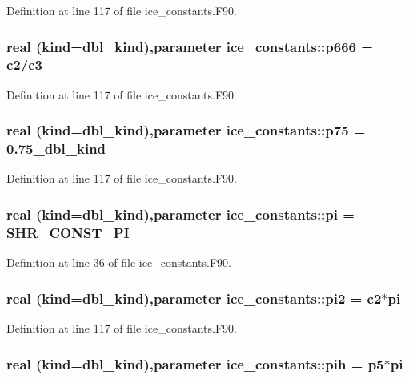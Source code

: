 Definition at line 117 of file ice\_\-constants.F90.\hypertarget{namespaceice__constants_a623680825d166c04e044e75e3eb2d6be}{
\subsubsection[{p666}]{\setlength{\rightskip}{0pt plus 5cm}real (kind=dbl\_\-kind),parameter {\bf ice\_\-constants::p666} = {\bf c2}/{\bf c3}}}
\label{namespaceice__constants_a623680825d166c04e044e75e3eb2d6be}


Definition at line 117 of file ice\_\-constants.F90.\hypertarget{namespaceice__constants_a266f93c94a2bacfaea88290d50220b36}{
\subsubsection[{p75}]{\setlength{\rightskip}{0pt plus 5cm}real (kind=dbl\_\-kind),parameter {\bf ice\_\-constants::p75} = 0.75\_\-dbl\_\-kind}}
\label{namespaceice__constants_a266f93c94a2bacfaea88290d50220b36}


Definition at line 117 of file ice\_\-constants.F90.\hypertarget{namespaceice__constants_ab88fe0d16ebc9529ef11d6fe4343c387}{
\subsubsection[{pi}]{\setlength{\rightskip}{0pt plus 5cm}real (kind=dbl\_\-kind),parameter {\bf ice\_\-constants::pi} = SHR\_\-CONST\_\-PI}}
\label{namespaceice__constants_ab88fe0d16ebc9529ef11d6fe4343c387}


Definition at line 36 of file ice\_\-constants.F90.\hypertarget{namespaceice__constants_ab0deb719f4161aeebe0b844228c8cf65}{
\subsubsection[{pi2}]{\setlength{\rightskip}{0pt plus 5cm}real (kind=dbl\_\-kind),parameter {\bf ice\_\-constants::pi2} = {\bf c2}$\ast${\bf pi}}}
\label{namespaceice__constants_ab0deb719f4161aeebe0b844228c8cf65}


Definition at line 117 of file ice\_\-constants.F90.\hypertarget{namespaceice__constants_a402bb772e4dd1130d8c9f19554e7fd4e}{
\subsubsection[{pih}]{\setlength{\rightskip}{0pt plus 5cm}real (kind=dbl\_\-kind),parameter {\bf ice\_\-constants::pih} = {\bf p5}$\ast${\bf pi}}}
\label{namespaceice__constants_a402bb772e4dd1130d8c9f19554e7fd4e}


